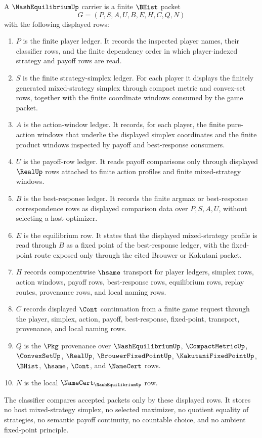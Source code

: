 \begin{definition}
\label{def:nash-equilibrium-carrier}
A $\NashEquilibriumUp$ carrier is a finite $\BHist$ packet
$$
G=(P,S,A,U,B,E,H,C,Q,N)
$$
with the following displayed rows:
\begin{enumerate}
\item $P$ is the finite player ledger. It records the inspected player names, their classifier rows, and the finite dependency order in which player-indexed strategy and payoff rows are read.
\item $S$ is the finite strategy-simplex ledger. For each player it displays the finitely generated mixed-strategy simplex through compact metric and convex-set rows, together with the finite coordinate windows consumed by the game packet.
\item $A$ is the action-window ledger. It records, for each player, the finite pure-action windows that underlie the displayed simplex coordinates and the finite product windows inspected by payoff and best-response consumers.
\item $U$ is the payoff-row ledger. It reads payoff comparisons only through displayed $\RealUp$ rows attached to finite action profiles and finite mixed-strategy windows.
\item $B$ is the best-response ledger. It records the finite argmax or best-response correspondence rows as displayed comparison data over $P,S,A,U$, without selecting a host optimizer.
\item $E$ is the equilibrium row. It states that the displayed mixed-strategy profile is read through $B$ as a fixed point of the best-response ledger, with the fixed-point route exposed only through the cited Brouwer or Kakutani packet.
\item $H$ records componentwise $\hsame$ transport for player ledgers, simplex rows, action windows, payoff rows, best-response rows, equilibrium rows, replay routes, provenance rows, and local naming rows.
\item $C$ records displayed $\Cont$ continuation from a finite game request through the player, simplex, action, payoff, best-response, fixed-point, transport, provenance, and local naming rows.
\item $Q$ is the $\Pkg$ provenance over $\NashEquilibriumUp$, $\CompactMetricUp$, $\ConvexSetUp$, $\RealUp$, $\BrouwerFixedPointUp$, $\KakutaniFixedPointUp$, $\BHist$, $\hsame$, $\Cont$, and $\NameCert$ rows.
\item $N$ is the local $\NameCert_{\NashEquilibriumUp}$ row.
\end{enumerate}
The classifier compares accepted packets only by these displayed rows. It stores no host mixed-strategy simplex, no selected maximizer, no quotient equality of strategies, no semantic payoff continuity, no countable choice, and no ambient fixed-point principle.
\end{definition}

